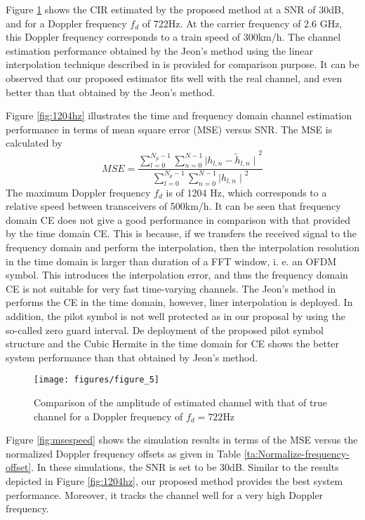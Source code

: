 \documentclass[AMA]{WileyNJD-v1}
\begin{document}
{{{Figure \ref{fig:cir722hz} shows  the  CIR estimated by the proposed method at a SNR of  30dB, and for a Doppler frequency  $f_{d}$ of 722Hz. At the carrier frequency of 2.6 GHz, this Doppler frequency corresponds to a train speed of 300km/h. The channel estimation performance obtained by the Jeon's method using the linear interpolation technique described in \cite{Jeon1999} is provided for comparison purpose. It can be observed that our proposed estimator fits well with the real channel, and even better than that obtained by the  Jeon's method. 


Figure \ref{fig:1204hz} illustrates the time and frequency domain channel estimation performance in terms of mean square error (MSE) versus SNR. The MSE is calculated by
%
\begin{equation}\label{eq:mse-calculate}
MSE=\dfrac{\sum_{l=0}^{N_p-1}\sum_{n=0}^{N-1} {\mid h_{l,n} - \tilde{h}_{l,n}\mid}^{2} }{{\sum_{l=0}^{N_p-1}\sum_{n=0}^{N-1} {\mid h_{l,n}\mid}^{2}}}
\end{equation}
%
The maximum Doppler frequency $f_{d}$ is of 1204 Hz, which corresponds to a relative speed between transceivers of 500km/h. It can be seen that frequency domain CE does not give a good performance in comparison with that provided by the time domain CE. This is because, if we transfers the received signal to the frequency domain and perform the interpolation, then the interpolation resolution in the time domain is larger than duration of a FFT window, i. e. an OFDM symbol. This introduces the interpolation error, and thus the frequency domain CE is not suitable for very fast time-varying channels. The Jeon's method in \cite{Jeon1999} performs the CE in the time domain, however, liner interpolation is deployed. In addition, the pilot symbol is not well protected as in our proposal by using the so-called zero guard interval. De deployment of the proposed pilot symbol structure and the Cubic Hermite in the time domain for CE shows the better system performance than that obtained by Jeon's method.  
%
\begin{figure}
	\centering
	\texttt{[image: figures/figure\_5]}
	\caption{Comparison of the amplitude of estimated channel with that of true channel for a Doppler frequency of $f_{d}=722$Hz}
	\label{fig:cir722hz}
\end{figure}
%		
Figure \ref{fig:msespeed} shows the simulation results in terms of the MSE versus the normalized Doppler frequency offsets as given in Table \ref{ta:Normalize-frequency-offset}. In these simulations, the SNR is set to be 30dB. Similar to the results depicted in Figure \ref{fig:1204hz}, our proposed method provides the best system performance. Moreover, it tracks the channel well for a very high Doppler frequency.
				
}}}
\end{document}
